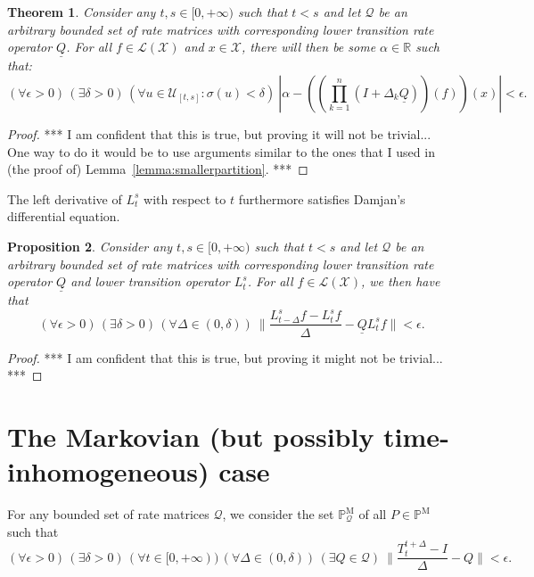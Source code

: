 \documentclass[a4paper,reqno]{amsart}
\newtheorem{theorem}{Theorem}
\newtheorem{proposition}[theorem]{Proposition}
\newcommand{\reals}{\mathbb{R}}
\newcommand{\states}{\mathcal{X}}
\newcommand{\processes}{\mathbb{P}}
\newcommand{\mprocesses}{\processes^{\mathrm{M}}}
\newcommand{\lbound}{L}
\newcommand{\gambles}{\mathcal{L}}
\newcommand{\gamblesX}{\gambles(\states)}
\newcommand{\rateset}{\mathcal{Q}}
\newcommand{\lrate}{\underline{Q}}
\newcommand{\abs}[1]{\left\vert #1 \right\vert}
\begin{document}
\begin{theorem}\label{theo:convergencelowerbound}
Consider any $t,s\in[0,+\infty)$ such that $t<s$ and let $\rateset$ be an arbitrary bounded set of rate matrices with corresponding lower transition rate operator $\lrate$. For all \mbox{$f\in\gamblesX$} and $x\in\states$, there will then be some $\alpha\in\reals$ such that:
\begin{equation*}
(\forall\epsilon>0)\,
(\exists\delta>0)\,
(\forall u\in\mathcal{U}_{[t,s]}\colon\sigma(u)<\delta)~\abs{\alpha - \left(\left(\prod_{k=1}^n(I+\Delta_k\lrate)\right)(f)\right)(x)}<\epsilon.
\end{equation*}
\end{theorem}
\begin{proof}
*** I am confident that this is true, but proving it will not be trivial... One way to do it would be to use arguments similar to the ones that I used in (the proof of) Lemma~\ref{lemma:smallerpartition}. ***
\end{proof}

The left derivative of $\lbound_t^s$ with respect to $t$ furthermore satisfies Damjan's differential equation.

\begin{proposition}
Consider any $t,s\in[0,+\infty)$ such that $t<s$ and let $\rateset$ be an arbitrary bounded set of rate matrices with corresponding lower transition rate operator $\lrate$ and lower transition operator $\lbound_t^s$. For all \mbox{$f\in\gamblesX$}, we then have that
\begin{equation*}
(\forall\epsilon>0)\,
(\exists\delta>0)\,
(\forall\Delta\in(0,\delta))~
\Big\lVert\frac{L_{t-\Delta}^sf-L_t^sf}{\Delta}-\lrate L_t^sf\Big\rVert<\epsilon.
\end{equation*}

\end{proposition}
\begin{proof}
*** I am confident that this is true, but proving it might not be trivial... ***
\end{proof}

\section{The Markovian (but possibly time-inhomogeneous) case}

For any bounded set of rate matrices $\rateset$, we consider the set $\mprocesses_{\rateset}$ of all $P\in\mprocesses$ such that
\begin{equation}\label{eq:conditionforMarkov}
(\forall\epsilon>0)\,
(\exists\delta>0)\,
(\forall t\in[0,+\infty))\,
(\forall\Delta\in(0,\delta))\,
(\exists Q\in\rateset)~
\Big\lVert\frac{T_t^{t+\Delta}-I}{\Delta}-Q\Big\rVert<\epsilon.
\end{equation}
\end{document}
